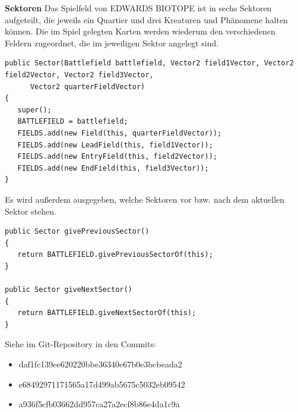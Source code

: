 \textbf{Sektoren}
Das Spielfeld von EDWARDS BIOTOPE ist in sechs Sektoren aufgeteilt, die jeweils ein Quartier und drei Kreaturen und Phänomene halten können. Die im Spiel gelegten Karten werden wiederum den verschiedenen Feldern zugeordnet, die im jeweiligen Sektor angelegt sind.
\begin{lstlisting}
public Sector(Battlefield battlefield, Vector2 field1Vector, Vector2 field2Vector, Vector2 field3Vector,
      Vector2 quarterFieldVector)
{
   super();
   BATTLEFIELD = battlefield;
   FIELDS.add(new Field(this, quarterFieldVector));
   FIELDS.add(new LeadField(this, field1Vector));
   FIELDS.add(new EntryField(this, field2Vector));
   FIELDS.add(new EndField(this, field3Vector));
}
\end{lstlisting}

Es wird außerdem ausgegeben, welche Sektoren vor bzw. nach dem aktuellen Sektor stehen.

\begin{lstlisting}
public Sector givePreviousSector()
{
   return BATTLEFIELD.givePreviousSectorOf(this);
}

public Sector giveNextSector()
{
   return BATTLEFIELD.giveNextSectorOf(this);
}
\end{lstlisting}

Siehe im Git-Repository in den Commits:
\begin{itemize}
\item daf1fc139ee620220bbe36340e67b0e3bcbeada2
\item e68492971171565a17d499ab5675c5032eb09542
\item a936f5cfb03662dd957ca27a2ecf8b86e4da1c9a
\end{itemize}

